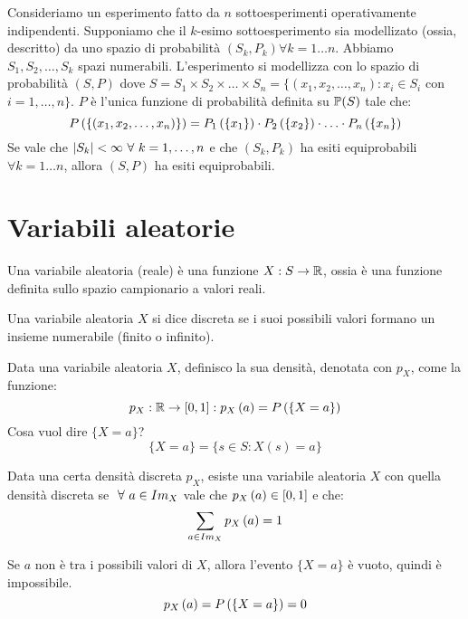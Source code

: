 Consideriamo un esperimento fatto da $n$ sottoesperimenti operativamente indipendenti. Supponiamo che il $k$-esimo sottoesperimento sia modellizato (ossia, descritto) da uno spazio di probabilit\`a $(S_k, P_k) \forall k = 1 \ldots n$. Abbiamo $S_1, S_2, \ldots, S_k$ spazi numerabili. L'esperimento si modellizza con lo spazio di probabilit\`a $(S, P)$ dove $S = S_1 \times S_2 \times \ldots \times S_n = \{ (x_1, x_2, \ldots, x_n) : x_i \in S_i$ con $i = 1, \ldots, n \}$. $P$ \`e l'unica funzione di probabilit\`a definita su $\parts(S)$ tale che:
\[
\prob{\{(x_1, x_2, \ldots, x_n)\}} = \prob[P_1]{\{x_1\}} \cdot \prob[P_2]{\{x_2\}} \cdot \ldots \cdot \prob[P_n]{\{x_n\}}
\]
Se vale che $\abs{S_k} < \infty \forall  k = 1, \ldots, n$ e che $(S_k, P_k)$ ha esiti equiprobabili $\forall  k = 1 \dots n$, allora $(S,P)$ ha esiti equiprobabili.

\section{Variabili aleatorie}

\begin{defn}
Una variabile aleatoria (reale) \`e una funzione $X : S \to \reals$, ossia \`e una funzione definita sullo spazio campionario a valori reali.
\end{defn}

\begin{defn}
Una variabile aleatoria $X$ si dice discreta se i suoi possibili valori formano un insieme numerabile (finito o infinito).
\end{defn}

\begin{defn}
Data una variabile aleatoria $X$, definisco la sua densit\`a, denotata con $p_X$, come la funzione:
\[
p_X : \reals \to [0,1] : \mass{a} = \prob{\{X = a\}}
\]
Cosa vuol dire $\{X = a\}$?
\[
\{X = a\} = \{ s \in S : X(s) = a\}
\]
\end{defn}
Data una certa densit\`a discreta $p_X$, esiste una variabile aleatoria $X$ con quella densit\`a discreta se $\forall a \in \image{X}$ vale che $\mass{a} \in [0,1]$ e che:
\[
\sum_{a \in \image{X}} \mass{a} = 1
\]

\begin{oss}
Se $a$ non \`e tra i possibili valori di $X$, allora l'evento $\{X = a\}$ \`e vuoto, quindi \`e impossibile.
\[
\mass{a} = \prob{\{X = a\}} = 0
\]
\end{oss}

